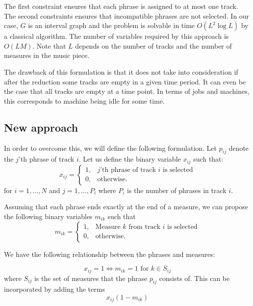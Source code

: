 \documentclass[11pt,a4paper]{article}
\begin{document}
The first constraint ensures that each phrase is assigned to at most one track. The second constraints ensures that incompatible phrases are not selected. In our case, $ G $ is an interval graph and the problem is solvable in time $ O(L^2 \log L) $ by a classical algorithm. The number of variables required by this approach is $ O(LM) $. Note that $ L $ depends on the number of tracks and the number of measures in the music piece.

The drawback of this formulation is that it does not take into consideration if after the reduction some tracks are empty in a given time period. It can even be the case that all tracks are empty at a time point. In terms of jobs and machines, this corresponds to machine being idle for some time. 

\subsection{New approach}
In order to overcome this, we will define the following formulation. Let $ p_{ij} $ denote the $ j $'th phrase of track $ i $. Let us define the binary variable $x_{ij}$ such that:
\begin{equation}
x_{ij} =   \begin{cases}%
1,      & \text{$j$'th phrase of track $i$ is selected}\\
0, & \text{otherwise.}
\end{cases}
\end{equation}
 for $ i = 1, \dots ,N $ and $ j=1, \dots ,P_i  $ where $P_i$ is the number of phrases in track $i$.


Assuming that each phrase ends exactly at the end of a measure, we can propose the following binary variables $m_{ik}$ such that
\begin{equation}
m_{ik} =   \begin{cases}%
1,      & \text{Measure $k$ from track $i$ is selected}\\
0, & \text{otherwise.}
\end{cases}
\end{equation}

We have the following relationship between the phrases and measures:
 
\begin{equation}\label{eq:phrasemeasure}
x_{ij} = 1 \iff m_{ik}=1 \mbox{ for } k \in S_{ij}
\end{equation}
 where $S_{ij}$ is the set of measures that the phrase $p_{ij}$ consists of. This can be incorporated by adding the terms 
 \begin{equation}
 x_{ij}(1-m_{ik})
 \end{equation}
 
\end{document}

